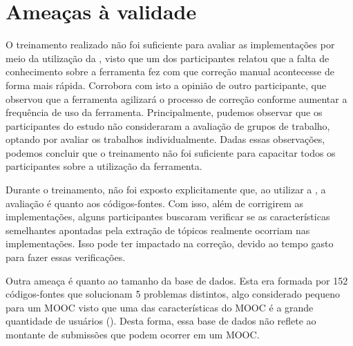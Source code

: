 %	
%	
%
%
%

	\section{Ameaças à validade}
	\label{sec:ameacas}
	
		O treinamento realizado não foi suficiente para avaliar as implementações por meio
		da utilização da , visto que um dos participantes relatou que
		a falta de conhecimento sobre a ferramenta fez com que correção manual acontecesse de
		forma mais rápida. Corrobora com isto a opinião de outro participante, que observou que a ferramenta agilizará
		o processo de correção conforme aumentar a frequência de uso da ferramenta. 
		Principalmente, pudemos observar que os participantes do estudo não consideraram a
		avaliação de grupos de trabalho, optando por avaliar os trabalhos individualmente.
		Dadas essas observações, podemos concluir que o treinamento não foi suficiente para
		capacitar todos os participantes sobre a utilização da ferramenta.
		
		Durante o treinamento, não foi exposto explicitamente que, ao utilizar a ,
		a avaliação é quanto aos códigos-fontes. Com isso, além de corrigirem as implementações,
		alguns participantes buscaram verificar se as características semelhantes apontadas
		pela extração de tópicos realmente ocorriam nas implementações. Isso pode ter
		impactado na correção, devido ao tempo gasto para fazer essas verificações.
		
		Outra ameaça é quanto ao tamanho da base de dados.
		Esta era formada por 152 códigos-fontes que solucionam 5 problemas distintos, algo
		considerado pequeno para um MOOC visto que uma das características do \ac{MOOC} é a grande
		quantidade de usuários (). Desta forma, essa base de dados não
		reflete ao montante de submissões que podem ocorrer em um \acs{MOOC}.
		
